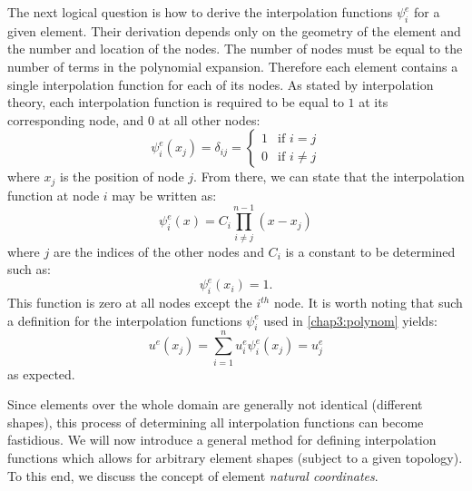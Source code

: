 \bigskip

The next logical question is how to derive the interpolation functions $ \psi^e_i  $ for a given element. Their derivation depends only on the geometry of the element and the number and location of the nodes. The number of nodes must be equal to the number of terms in the polynomial expansion. Therefore each element contains a single interpolation function for each of its nodes. As stated by interpolation theory, each interpolation function is required to be equal to $1$ at its corresponding node, and $0$ at all other nodes:
\begin{equation} 
	\psi^e_i(x_j) = \delta_{ij} = 
	\begin{cases} 
		1 & \text{if } i = j \\ 
		0 & \text{if } i \neq j
	\end{cases}
\end{equation}
where $ x_j $ is the position of node $j$. From there, we can state that the interpolation function at node $ i $ may be written as:
\begin{equation}
\psi^e_i(x) = C_i \prod_{i \neq j}^{n-1} (x-x_j)
\end{equation}
where $ j $ are the indices of the other nodes and $ C_i $ is a constant to be determined such as:
\begin{equation}
\psi^e_i(x_i) = 1.
\end{equation}
This function is zero at all nodes except the $i^{th}$ node. It is worth noting that such a definition for the interpolation functions $ \psi^e_i $ used in \eqref{chap3:polynom} yields:
\begin{equation}
u^e(x_j) = \sum_{i=1}^n u^e_i \psi^e_i(x_j) = u^e_j
\end{equation}
as expected. 

Since elements over the whole domain are generally not identical (different shapes), this process of determining all interpolation functions can become fastidious. We will now introduce a general method for defining interpolation functions which allows for arbitrary element shapes (subject to a given topology). To this end, we discuss the concept of element \emph{natural coordinates}.

